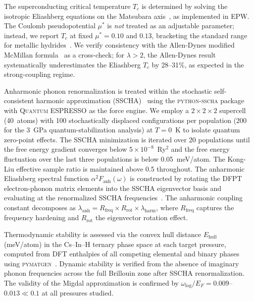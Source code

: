 The superconducting critical temperature $T_c$ is determined by
solving the isotropic Eliashberg equations on the Matsubara
axis~\cite{Marsiglio2003}, as implemented in EPW. The Coulomb
pseudopotential $\mu^*$ is \emph{not} treated as an adjustable
parameter; instead, we report $T_c$ at fixed $\mu^* = 0.10$ and
$0.13$, bracketing the standard range for metallic
hydrides~\cite{Allen1975}. We verify consistency with the
Allen-Dynes modified McMillan formula~\cite{Allen1975} as a
cross-check; for $\lambda > 2$, the Allen-Dynes result systematically
underestimates the Eliashberg $T_c$ by 28--31\%, as expected in the
strong-coupling regime.

Anharmonic phonon renormalization is treated within the stochastic
self-consistent harmonic approximation
(SSCHA)~\cite{Monacelli2021,Errea2014} using the
\textsc{python-sscha} package with \textsc{Quantum ESPRESSO} as the
force engine. We employ a $2 \times 2 \times 2$ supercell (40~atoms)
with 100 stochastically displaced configurations per population
(200 for the 3~GPa quantum-stabilization analysis) at $T = 0$~K to
isolate quantum zero-point effects. The SSCHA minimization is
iterated over 20 populations until the free energy gradient converges
below $5 \times 10^{-8}$~Ry$^2$ and the free energy fluctuation
over the last three populations is below 0.05~meV/atom. The Kong-Liu
effective sample ratio is maintained above 0.5 throughout. The
anharmonic Eliashberg spectral function $\alpha^2F_{\mathrm{anh}}(\omega)$
is constructed by rotating the DFPT electron-phonon matrix elements
into the SSCHA eigenvector basis and evaluating at the renormalized
SSCHA frequencies~\cite{Errea2015,Belli2025}. The anharmonic coupling
constant decomposes as
$\lambda_{\mathrm{anh}} = R_{\mathrm{freq}} \times R_{\mathrm{rot}} \times \lambda_{\mathrm{harm}}$,
where $R_{\mathrm{freq}}$ captures the frequency hardening and
$R_{\mathrm{rot}}$ the eigenvector rotation effect.

Thermodynamic stability is assessed via the convex hull distance
$E_{\mathrm{hull}}$ (meV/atom) in the Cs--In--H ternary phase space
at each target pressure, computed from DFT enthalpies of all competing
elemental and binary phases using
\textsc{pymatgen}~\cite{Ong2013}. Dynamic stability is verified from
the absence of imaginary phonon frequencies across the full Brillouin
zone after SSCHA renormalization. The validity of the Migdal
approximation is confirmed by $\omega_{\log}/E_F = 0.009$--$0.013
\ll 0.1$ at all pressures studied.


